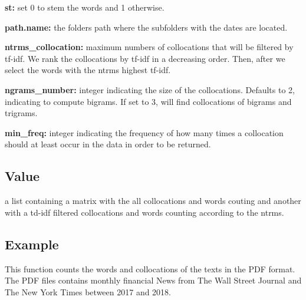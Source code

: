 \documentclass[]{article}
\begin{document}
\textbf{st:} set 0 to stem the words and 1 otherwise.

\textbf{path.name:} the folders path where the subfolders with the dates
are located.

\textbf{ntrms\_collocation:} maximum numbers of collocations that will
be filtered by tf-idf. We rank the collocations by tf-idf in a
decreasing order. Then, after we select the words with the ntrms highest
tf-idf.

\textbf{ngrams\_number:} integer indicating the size of the
collocations. Defaults to 2, indicating to compute bigrams. If set to 3,
will find collocations of bigrams and trigrams.

\textbf{min\_freq:} integer indicating the frequency of how many times a
collocation should at least occur in the data in order to be returned.

\subsection{Value}\label{value-2}

a list containing a matrix with the all collocations and words couting
and another with a td-idf filtered collocations and words counting
according to the ntrms.

\subsection{Example}\label{example-2}

This function counts the words and collocations of the texts in the PDF
format. The PDF files contains monthly financial News from The Wall
Street Journal and The New York Times between 2017 and 2018.
\end{document}
